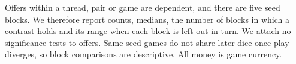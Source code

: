 Offers within a thread, pair or game are dependent, and there are five seed blocks. We therefore report counts, medians, the number of blocks in which a contrast holds and its range when each block is left out in turn. We attach no significance tests to offers. Same-seed games do not share later dice once play diverges, so block comparisons are descriptive. All money is game currency.

